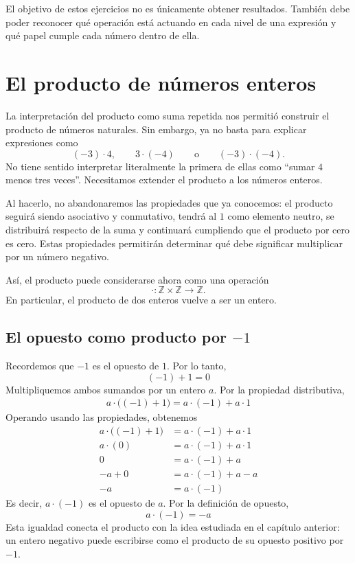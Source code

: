 El objetivo de estos ejercicios no es únicamente obtener resultados. También debe poder reconocer qué operación está actuando en cada nivel de una expresión y qué papel cumple cada número dentro de ella.

\section{El producto de números enteros}

La interpretación del producto como suma repetida nos permitió construir el producto de números naturales. Sin embargo, ya no basta para explicar expresiones como
\[
(-3)\cdot4,
\qquad
3\cdot(-4)
\qquad\text{o}\qquad
(-3)\cdot(-4).
\]
No tiene sentido interpretar literalmente la primera de ellas como ``sumar \(4\) menos tres veces''. Necesitamos extender el producto a los números enteros.

Al hacerlo, no abandonaremos las propiedades que ya conocemos: el producto seguirá siendo asociativo y conmutativo, tendrá al \(1\) como elemento neutro, se distribuirá respecto de la suma y continuará cumpliendo que el producto por cero es cero. Estas propiedades permitirán determinar qué debe significar multiplicar por un número negativo.

Así, el producto puede considerarse ahora como una operación
\[
\cdot\colon\mathbb{Z}\times\mathbb{Z}\to\mathbb{Z}.
\]
En particular, el producto de dos enteros vuelve a ser un entero.

\subsection{El opuesto como producto por \texorpdfstring{\(-1\)}{-1}}

Recordemos que \(-1\) es el opuesto de \(1\). Por lo tanto,
\[
(-1)+1=0
\]
Multipliquemos ambos sumandos por un entero \(a\). Por la propiedad distributiva,
\begin{gather*}
a\cdot\bigl((-1)+1\bigr)
=a\cdot(-1)+a\cdot1
\end{gather*}
Operando usando las propiedades, obtenemos
\begin{align*}
  a\cdot\bigl((-1)+1\bigr) &= a\cdot(-1)+a\cdot 1 \\ 
  a \cdot (0) &= a\cdot(-1) + a\cdot1 \\ 
  0 &= a\cdot(-1) + a \\ 
  -a + 0 &= a\cdot(-1) +a - a \\ 
  -a &= a\cdot(-1)
\end{align*}
Es decir, \(a\cdot(-1)\) es el opuesto de \(a\). Por la definición de opuesto,
\[
\boxed{a\cdot(-1)=-a}
\]
Esta igualdad conecta el producto con la idea estudiada en el capítulo anterior: un entero negativo puede escribirse como el producto de su opuesto positivo por \(-1\).

